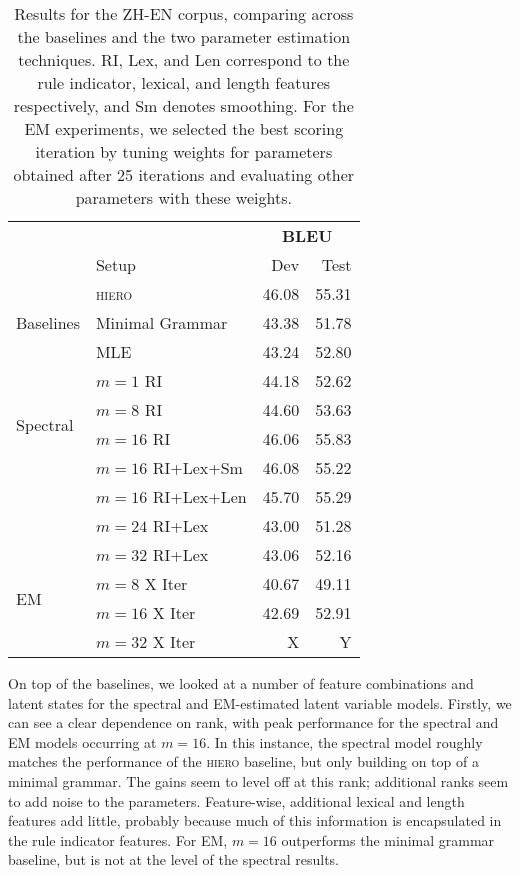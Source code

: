 \documentclass[11pt]{article}
\begin{document}
\begin{table}[t!]
\begin{small}
  \begin{center}
    \begin{tabular}{|l|p{}rr|}
      \hline
	  & & \multicolumn{2}{c|}{\bf BLEU} \\
      & Setup & Dev & Test \\
	  \hline
	  \multirow{3}{*}{Baselines} & \textsc{hiero} & 46.08 & 55.31 \\
      & Minimal Grammar & 43.38 & 51.78 \\
	  & MLE & 43.24 & 52.80 \\ \hline
	  \multirow{4}{*}{Spectral} &  $m=1$ RI & 44.18 & 52.62 \\
	  & $m=8$ RI & 44.60 & 53.63 \\
	  & $m=16$ RI & 46.06 & 55.83 \\
	  & $m=16$ RI+Lex+Sm & 46.08 & 55.22 \\ 
	  & $m=16$ RI+Lex+Len & 45.70 & 55.29 \\ 
	  & $m=24$ RI+Lex & 43.00 & 51.28 \\ 
	  & $m=32$ RI+Lex & 43.06 & 52.16 \\ \hline
	  \multirow{2}{*}{EM} & $m=8$ X Iter & 40.67 & 49.11 \\
	  & $m=16$ X Iter & 42.69 & 52.91 \\
	  & $m=32$ X Iter & X & Y \\
	  \hline
	\end{tabular}
  \end{center}
  \caption{Results for the \textsc{ZH-EN} corpus, comparing across the baselines and the two parameter estimation techniques.
  RI, Lex, and Len correspond to the rule indicator, lexical, and length features respectively, and Sm denotes smoothing.
  For the EM experiments, we selected the best scoring iteration by tuning weights for parameters obtained after 25 iterations and evaluating other parameters with these weights. }
  \label{tab:zh-en-results}
\end{small}
\end{table}

On top of the baselines, we looked at a number of feature combinations and latent states for the spectral and EM-estimated latent variable models.  
Firstly, we can see a clear dependence on rank, with peak performance for the spectral and EM models occurring at $m=16$. 
In this instance, the spectral model roughly matches the performance of the \textsc{hiero} baseline, but only building on top of a minimal grammar.  
The gains seem to level off at this rank; additional ranks seem to add noise to the parameters. 
Feature-wise, additional lexical and length features add little, probably because much of this information is encapsulated in the rule indicator features. 
For EM, $m=16$ outperforms the minimal grammar baseline, but is not at the level of the spectral results.  
\end{document}
